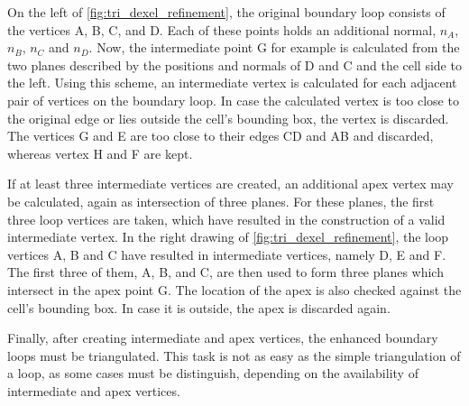 On the left of \cref{fig:tri_dexel_refinement}, the original boundary loop consists of the vertices A, B, C, and D.
Each of these points holds an additional normal, $n_A$, $n_B$, $n_C$ and $n_D$.
Now, the intermediate point G for example is calculated from the two planes described by the positions and normals of D and C and the cell side to the left.
Using this scheme, an intermediate vertex is calculated for each adjacent pair of vertices on the boundary loop.
In case the calculated vertex is too close to the original edge or lies outside the cell's bounding box, the vertex is discarded.
The vertices G and E are too close to their edges CD and AB and discarded, whereas vertex H and F are kept.

If at least three intermediate vertices are created, an additional apex vertex may be calculated, again as intersection of three planes.
For these planes, the first three loop vertices are taken, which have resulted in the construction of a valid intermediate vertex.
In the right drawing of \cref{fig:tri_dexel_refinement}, the loop vertices A, B and C have resulted in intermediate vertices, namely D, E and F.
The first three of them, A, B, and C, are then used to form three planes which intersect in the apex point G.
The location of the apex is also checked against the cell's bounding box.
In case it is outside, the apex is discarded again.

Finally, after creating intermediate and apex vertices, the enhanced boundary loops must be triangulated.
This task is not as easy as the simple triangulation of a loop, as some cases must be distinguish, depending on the availability of intermediate and apex vertices.

